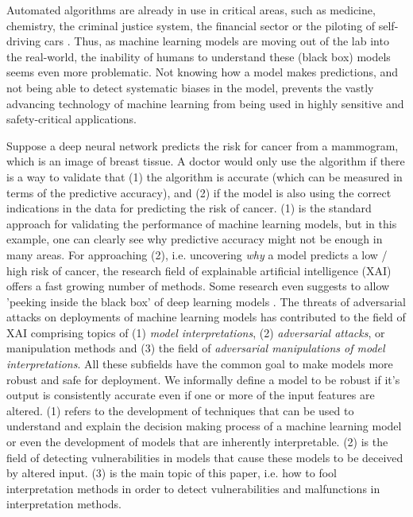 Automated algorithms are already in use in critical areas, such as medicine, chemistry, the criminal justice system, the financial sector or the piloting of self-driving cars \cite{chouldechova2017fair, elshawi2019interpretability, whitmore2016mapping}. %
Thus, as machine learning models are moving out of the lab into the real-world, the inability of humans to understand these (black box) models seems even more problematic. Not knowing how a model makes predictions, and not being able to detect systematic biases in the model, prevents the vastly advancing technology of machine learning from being used in highly sensitive and safety-critical applications.  

Suppose a deep neural network predicts the risk for cancer from a mammogram, which is an image of breast tissue. A doctor would only use the algorithm if there is a way to validate that (1) the algorithm is accurate (which can be measured in terms of the predictive accuracy), and (2) if the model is also using the correct indications in the data for predicting the risk of cancer. (1) is the standard approach for validating the performance of machine learning models, but in this example, one can clearly see why predictive accuracy might not be enough in many areas. For approaching (2), i.e. uncovering \textit{why} a model predicts a low / high risk of cancer, the research field of explainable artificial intelligence (XAI) offers a fast growing number of methods. Some research even suggests to allow 'peeking inside the black box' of deep learning models \cite{adadi2018peeking}.  
The threats of adversarial attacks on deployments of machine learning models has contributed to the field of XAI comprising topics of (1) \textit{model interpretations}, (2) \textit{adversarial attacks}, or manipulation methods and (3) the field of \textit{adversarial manipulations of model interpretations}. All these subfields have the common goal to make models more robust and safe for deployment. We informally define a model to be robust if it's output is consistently accurate even if one or more of the input features are altered. 
(1) refers to the development of techniques that can be used to understand and explain the decision making process of a machine learning model or even the development of models that are inherently interpretable. (2) is the field of detecting vulnerabilities in models that cause these models to be deceived by altered input. 
(3) is the main topic of this paper, i.e. how to fool interpretation methods in order to detect vulnerabilities and malfunctions in interpretation methods. 

